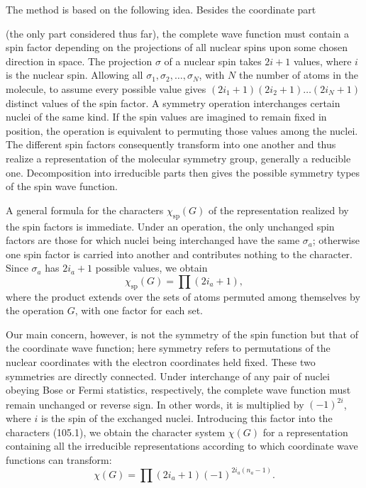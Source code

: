 The method is based on the following idea. Besides the coordinate part

(the only part considered thus far), the complete wave function must contain a spin factor depending on the projections of all nuclear spins upon some chosen direction in space. The projection $\sigma$ of a nuclear spin takes $2i+1$ values, where $i$ is the nuclear spin. Allowing all $\sigma_1,\sigma_2,\ldots,\sigma_N$, with $N$ the number of atoms in the molecule, to assume every possible value gives $(2i_1+1)(2i_2+1)\ldots(2i_N+1)$ distinct values of the spin factor. A symmetry operation interchanges certain nuclei of the same kind. If the spin values are imagined to remain fixed in position, the operation is equivalent to permuting those values among the nuclei. The different spin factors consequently transform into one another and thus realize a representation of the molecular symmetry group, generally a reducible one. Decomposition into irreducible parts then gives the possible symmetry types of the spin wave function.

A general formula for the characters $\chi_{\mathrm{sp}}(G)$ of the representation realized by the spin factors is immediate. Under an operation, the only unchanged spin factors are those for which nuclei being interchanged have the same $\sigma_a$; otherwise one spin factor is carried into another and contributes nothing to the character. Since $\sigma_a$ has $2i_a+1$ possible values, we obtain
\begin{equation}
 \chi_{\mathrm{sp}}(G)=\prod(2i_a+1), \tag{105.1}
\end{equation}
where the product extends over the sets of atoms permuted among themselves by the operation $G$, with one factor for each set.

Our main concern, however, is not the symmetry of the spin function but that of the coordinate wave function; here symmetry refers to permutations of the nuclear coordinates with the electron coordinates held fixed. These two symmetries are directly connected. Under interchange of any pair of nuclei obeying Bose or Fermi statistics, respectively, the complete wave function must remain unchanged or reverse sign. In other words, it is multiplied by $(-1)^{2i}$, where $i$ is the spin of the exchanged nuclei. Introducing this factor into the characters (105.1), we obtain the character system $\chi(G)$ for a representation containing all the irreducible representations according to which coordinate wave functions can transform:
\begin{equation}
 \chi(G)=\prod(2i_a+1)(-1)^{2i_a(n_a-1)}. \tag{105.2}
\end{equation}

